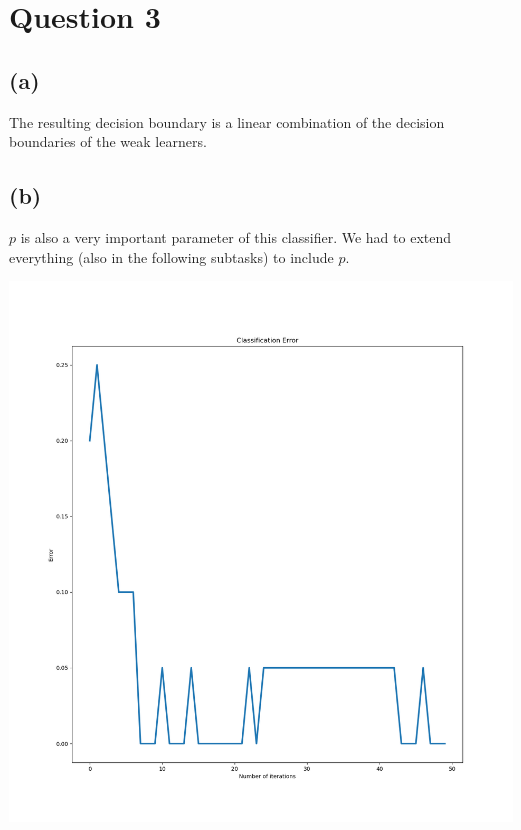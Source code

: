\section*{Question 3}
\subsection*{(a)}
The resulting decision boundary is a linear combination of the decision boundaries of the weak learners.

\subsection*{(b)}
$p$ is also a very important parameter of this classifier. We had to extend everything (also in the following subtasks) to include $p$.

\includegraphics[width=.5\textwidth]{q3_adaboost_python/Figure_CROSS_1.png}

